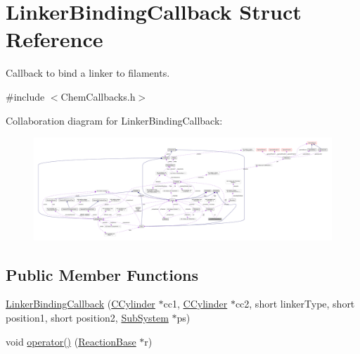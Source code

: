 \hypertarget{structLinkerBindingCallback}{\section{Linker\+Binding\+Callback Struct Reference}
\label{structLinkerBindingCallback}
}


Callback to bind a linker to filaments.  




{\ttfamily \#include $<$Chem\+Callbacks.\+h$>$}



Collaboration diagram for Linker\+Binding\+Callback\+:\nopagebreak
\begin{figure}[H]
\begin{center}
\leavevmode
\includegraphics[width=350pt]{structLinkerBindingCallback__coll__graph}
\end{center}
\end{figure}
\subsection*{Public Member Functions}
\begin{DoxyCompactItemize}
\item 
\hyperlink{structLinkerBindingCallback_a5e4fbddc0c535daef933ce2e42a7f8f4}{Linker\+Binding\+Callback} (\hyperlink{classCCylinder}{C\+Cylinder} $\ast$cc1, \hyperlink{classCCylinder}{C\+Cylinder} $\ast$cc2, short linker\+Type, short position1, short position2, \hyperlink{classSubSystem}{Sub\+System} $\ast$ps)
\item 
void \hyperlink{structLinkerBindingCallback_a401ea7895bbb4e21a6c6139fd14ba6b7}{operator()} (\hyperlink{classReactionBase}{Reaction\+Base} $\ast$r)
\end{DoxyCompactItemize}
